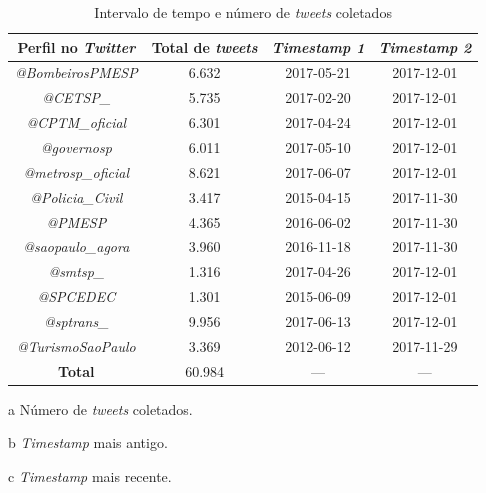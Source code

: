 \documentclass[
	12pt,				%
	oneside,			%
	a4paper,			%
	english,			%
	brazil				%
	]{abntex2ppgsi}
\begin{document}
{{\begin{table}[!htb]
\centering
\caption{Intervalo de tempo e número de \textit{tweets} coletados}
	\label{tab:tweetsCollected}
\begin{threeparttable}
\begin{tabular}{c|c|c|c}
\toprule
\textbf {Perfil no \textit{Twitter}} &\textbf{Total de \textit{tweets}\tnote{a}}  &\textbf{ \textit{Timestamp 1\tnote{b}}} & \textbf{\textit{Timestamp 2\tnote{c}}} \\ 
\midrule
\textit{@BombeirosPMESP} & 6.632 & 2017-05-21 & 2017-12-01 \\
\hline
\textit{@CETSP\_} & 5.735 & 2017-02-20  & 2017-12-01 \\
\hline
\textit{@CPTM\_oficial} & 6.301 & 2017-04-24 & 2017-12-01 \\
\hline
\textit{@governosp}  & 6.011 & 2017-05-10 & 2017-12-01 \\
\hline
\textit{@metrosp\_oficial} & 8.621 & 2017-06-07 & 2017-12-01 \\
\hline
\textit{@Policia\_Civil}  & 3.417 & 2015-04-15 & 2017-11-30 \\
\hline
\textit{@PMESP}  & 4.365 & 2016-06-02 & 2017-11-30 \\
\hline
\textit{@saopaulo\_agora}  & 3.960 & 2016-11-18 & 2017-11-30 \\
\hline
\textit{@smtsp\_} & 1.316 & 2017-04-26 & 2017-12-01 \\
\hline
\textit{@SPCEDEC} & 1.301 & 2015-06-09 & 2017-12-01 \\
\hline
\textit{@sptrans\_} & 9.956 & 2017-06-13 & 2017-12-01 \\
\hline
\textit{@TurismoSaoPaulo} & 3.369 & 2012-06-12 & 2017-11-29 \\
\midrule
\midrule
\textbf{Total} & 60.984 & --- & --- \\
\bottomrule
\end{tabular}
\begin{tablenotes}
            \item[a] Número de \textit{tweets} coletados.
            \item[b] \textit{Timestamp} mais antigo.
            \item[c] \textit{Timestamp} mais recente.
        \end{tablenotes}
\end{threeparttable}
\end{table}

\clearpage

}}
\end{document}
